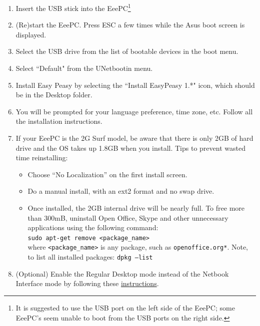 \begin{enumerate}
\item Insert the USB stick into the EeePC\footnote{It is suggested to use the USB port on the left side of the EeePC; some EeePC's seem unable to boot from the USB ports on the right side.}

\item (Re)start the EeePC. Press ESC a few times while the Asus boot screen is displayed.


\item Select the USB drive from the list of bootable devices in the boot menu.

\item Select ``Default" from the UNetbootin menu.

\item Install Easy Peasy by selecting the ``Install EasyPeasy 1.*" icon, which should be in the Desktop folder.

\item You will be prompted for your language preference, time zone, etc. Follow all the installation instructions.

\item If your EeePC is the 2G Surf model, be aware that there is only 2GB of hard drive and the OS takes up 1.8GB when you install. Tips to prevent wasted time reinstalling:
\begin{itemize}
\item Choose ``No Localization'' on the first install screen.
\item Do a manual install, with an ext2 format and no swap drive.
\item Once installed, the 2GB internal drive will be nearly full. To free more than 300mB, uninstall Open Office, Skype and other unnecessary applications using the following command:\\
\texttt{sudo apt-get remove <package\_name>}\\
where \texttt{<package\_name>} is any package, such as \texttt{openoffice.org*}. Note, to list all installed packages: \texttt{dpkg --list}\\
\end{itemize}

\item (Optional) Enable the Regular Desktop mode instead of the Netbook Interface mode by following these \href{http://wiki.geteasypeasy.com/How_to_use_Regular_Desktop_mode_instead_of_the_Netbook_Interface_mode}{instructions}.


\end{enumerate}
